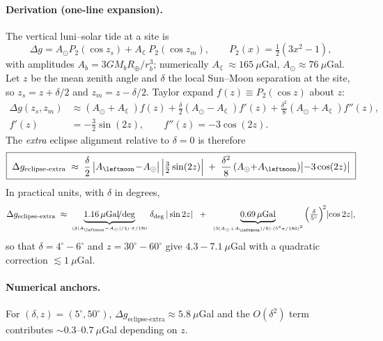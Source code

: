 \paragraph{Derivation (one-line expansion).}
The vertical luni–solar tide at a site is
\begin{equation}
\Delta g = A_\odot P_{2}(\cos z_s) + A_{\leftmoon} P_{2}(\cos z_m),
\qquad
P_{2}(x)=\tfrac{1}{2}(3x^{2}-1),
\label{eq:eclipse-tide-master}
\end{equation}
with amplitudes $A_b = 3 G M_b R_\oplus / r_b^3$; numerically
$A_{\leftmoon}\!\approx\!165~\mu\mathrm{Gal}$, $A_\odot\!\approx\!76~\mu\mathrm{Gal}$.
Let $z$ be the mean zenith angle and $\delta$ the local Sun–Moon separation at the site,
so $z_s = z + \delta/2$ and $z_m = z - \delta/2$. Taylor expand
$f(z)\equiv P_2(\cos z)$ about $z$:
\begin{align}
\Delta g(z_s,z_m)
&\approx (A_\odot{+}A_{\leftmoon}) f(z)
 + \frac{\delta}{2}(A_\odot{-}A_{\leftmoon}) f'(z)
 + \frac{\delta^2}{8}(A_\odot{+}A_{\leftmoon}) f''(z),
\label{eq:eclipse-expand}
\\
f'(z) &= -\tfrac{3}{2}\sin(2z), \qquad
f''(z) = -3\cos(2z).
\end{align}
The \emph{extra} eclipse alignment relative to $\delta\!=\!0$ is therefore
\begin{equation}
\boxed{\;
\Delta g_{\text{eclipse-extra}}
\;\approx\;
\frac{\delta}{2}\,\bigl|A_{\leftmoon}\!-\!A_\odot\bigr|\,\Bigl|\tfrac{3}{2}\sin(2z)\Bigr|
\;+\;
\frac{\delta^{2}}{8}\,(A_\odot{+}A_{\leftmoon})\bigl|{-}3\cos(2z)\bigr|
\;}
\label{eq:eclipse-practical}
\end{equation}
In practical units, with $\delta$ in degrees,
\begin{equation}
\Delta g_{\text{eclipse-extra}} \;\approx\;
\underbrace{1.16\,\mu\mathrm{Gal}\!/\!\deg}_{\scriptscriptstyle (3|A_{\leftmoon}{-}A_\odot|/4)\cdot\pi/180}\,
\delta_{\deg}\,|\sin 2z|
\;\;+\;\;
\underbrace{0.69\,\mu\mathrm{Gal}}_{\scriptscriptstyle (3(A_\odot{+}A_{\leftmoon})/8)\cdot(5^\circ \!\cdot\!\pi/180)^2}\,
\Bigl(\tfrac{\delta}{5^\circ}\Bigr)^{\!2} |{\cos 2z}|,
\label{eq:eclipse-rulet}
\end{equation}
so that $\delta=4^\circ\!-\!6^\circ$ and $z=30^\circ\!-\!60^\circ$ give $4.3\!-\!7.1~\mu$Gal
with a quadratic correction $\lesssim 1~\mu$Gal.
\vspace{-0.35\baselineskip}

\paragraph{Numerical anchors.}
For $(\delta,z)=(5^\circ,50^\circ)$,
$\Delta g_{\text{eclipse-extra}}\approx 5.8~\mu$Gal and the $O(\delta^2)$ term contributes
$\sim\!0.3$–$0.7~\mu$Gal depending on $z$.


